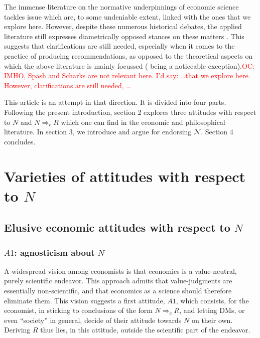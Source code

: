 \documentclass[preprint, french, english, 11pt, authoryear]{elsarticle}%
\newcommand{\protectforpdf}[1]{\texorpdfstring{\ensuremath{#1}}{#1}}
\newcommand{\commentOC}[1]{\textcolor{red}{OC: #1}}
\newcommand{\adv}{\mathscr{N}}
\begin{document}
The immense literature on the normative underpinnings of economic science \citep{buchanan_positive_1959,sen_nature_1967,dwyer_scientific_1985, heath_value_1994,mongin_value_2006,baujard_value_2013} tackles issue which are, to some undeniable extent, linked with the ones that we explore here. However, despite these numerous historical debates, the applied literature still expresses diametrically opposed stances on these matters \citep{spash_bulldozing_2015, scharks_dont_2016}. This suggests that clarifications are still needed, especially when it comes to the practice of producing recommendations, as opposed to the theoretical aspects on which the above literature is mainly focussed (\citet{baujard_value_2013} being a noticeable exception).\commentOC{IMHO, Spash and Scharks are not relevant here. I’d say: …that we explore here. However, clarifications are still needed, …}

This article is an attempt in that direction. It is divided into four parts. Following the present introduction, section 2 explores three attitudes with respect to $N$ and $N ⇒_c R$ which one can find in the economic and philosophical literature. In section 3, we introduce and argue for endorsing $\adv$. Section 4 concludes.

\section{Varieties of attitudes with respect to \protectforpdf{N}}
\label{sec:existing}
\subsection{Elusive economic attitudes with respect to \protectforpdf{N}}
\subsubsection{\protectforpdf{A1}: agnosticism about \protectforpdf{N}}
A widespread vision among economists is that economics is a value-neutral, purely scientific endeavor. This approach admits that value-judgments are essentially non-scientific, and that economics as a science should therefore eliminate them. This vision suggests a first attitude, $A1$, which consists, for the economist, in sticking to conclusions of the form $N ⇒_c R$, and letting \acp{DM}, or even “society” in general, decide of their attitude towards $N$ on their own. Deriving $R$ thus lies, in this attitude, outside the scientific part of the endeavor. 
\end{document}
